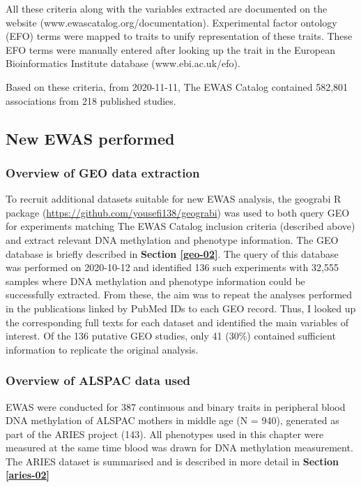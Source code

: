 \documentclass[11pt,oneside]{bristolthesis}
\begin{document}
All these criteria along with the variables extracted are documented on the website (www.ewascatalog.org/documentation). Experimental factor ontology (EFO) terms were mapped to traits to unify representation of these traits. These EFO terms were manually entered after looking up the trait in the European Bioinformatics Institute database (www.ebi.ac.uk/efo).

Based on these criteria, from 2020-11-11, The EWAS Catalog contained 582,801 associations from 218 published studies.

\hypertarget{new-ewas-03}{%
\subsection{New EWAS performed}\label{new-ewas-03}}

\hypertarget{geo-data-extraction}{%
\subsubsection{Overview of GEO data extraction}\label{geo-data-extraction}}

To recruit additional datasets suitable for new EWAS analysis, the geograbi R package (\url{https://github.com/yousefi138/geograbi}) was used to both query GEO for experiments matching The EWAS Catalog inclusion criteria (described above) and extract relevant DNA methylation and phenotype information. The GEO database is briefly described in \textbf{Section \ref{geo-02}}. The query of this database was performed on 2020-10-12 and identified 136 such experiments with 32,555 samples where DNA methylation and phenotype information could be successfully extracted. From these, the aim was to repeat the analyses performed in the publications linked by PubMed IDs to each GEO record. Thus, I looked up the corresponding full texts for each dataset and identified the main variables of interest. Of the 136 putative GEO studies, only 41 (30\%) contained sufficient information to replicate the original analysis.

\hypertarget{alspac-03}{%
\subsubsection{Overview of ALSPAC data used}\label{alspac-03}}

EWAS were conducted for 387 continuous and binary traits in peripheral blood DNA methylation of ALSPAC mothers in middle age (N = 940), generated as part of the ARIES project (143). All phenotypes used in this chapter were measured at the same time blood was drawn for DNA methylation measurement. The ARIES dataset is summarised and is described in more detail in \textbf{Section \ref{aries-02}}
\end{document}
